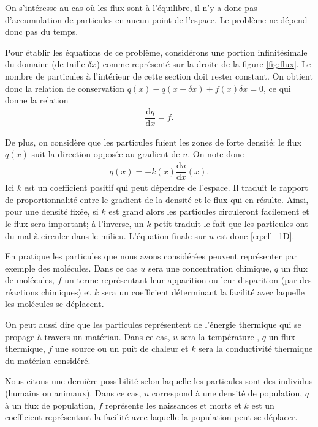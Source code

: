 \documentclass[12pt,a4paper,twoside]{article}
\begin{document}
On s'int\'eresse au cas o\`u les flux sont \`a l'\'equilibre, il n'y
a donc pas d'accumulation de particules en aucun point de l'espace.
Le probl\`eme ne d\'epend donc pas du temps.


Pour \'etablir les \'equations de ce probl\`eme,
consid\'erons une portion infinit\'esimale du domaine (de taille $\delta x$) comme
repr\'esent\'e sur la droite de la figure \ref{fig:flux}.
Le nombre de particules \`a l'int\'erieur de cette section doit
rester constant.
On obtient donc la relation de conservation
$q(x) - q(x+\delta x) + f(x) \delta x = 0$,
ce qui donne la relation
\begin{align}
  \label{eq:eq_flux}
  \dfrac{\mathrm{d} q}{\mathrm{d} x} = f .
\end{align}

De plus, on consid\`ere que les particules fuient les zones de forte densit\'e:
le flux $q(x)$ suit la direction oppos\'ee au gradient de $u$.
On note donc 
\begin{align}
  \label{eq:def_flux}
  q(x) = - k(x) \dfrac{\mathrm{d} u}{\mathrm{d} x}(x) . 
\end{align}
Ici $k$ est un coefficient positif qui peut d\'ependre de l'espace.
Il traduit le rapport de proportionnalit\'e entre le gradient de la densit\'e
et le flux qui en r\'esulte. Ainsi, pour une densit\'e fix\'ee,
si $k$ est grand alors les particules circuleront facilement et le flux sera important;
\`a l'inverse, un $k$ petit traduit le fait que les particules ont du mal \`a circuler dans
le milieu.
L'\'equation finale sur $u$ est donc \eqref{eq:ell_1D}.



En pratique les particules que nous avons consid\'er\'ees peuvent 
repr\'esenter par exemple des mol\'ecules.
Dans ce cas $u$ sera une concentration chimique, $q$ un flux de mol\'ecules, 
$f$ un terme repr\'esentant leur apparition ou leur disparition
(par des r\'eactions chimiques) et
$k$ sera un coefficient d\'eterminant la facilit\'e avec laquelle
les mol\'ecules se d\'eplacent.

On peut aussi dire que les particules repr\'esentent de l'\'energie thermique
qui se propage \`a travers un mat\'eriau.
Dans ce cas, $u$ sera la temp\'erature , $q$ un flux thermique, $f$ une source
ou un puit de chaleur et $k$ sera la conductivit\'e thermique du mat\'eriau consid\'er\'e.

Nous citons une derni\`ere possibilit\'e selon laquelle les particules sont des
individus (humains ou animaux).
Dans ce cas, $u$ correspond \`a une densit\'e de population,
$q$ \`a un flux de population, $f$ repr\'esente les naissances et morts
et $k$ est un coefficient repr\'esentant la
facilit\'e avec laquelle la population peut se d\'eplacer. 
\end{document}
